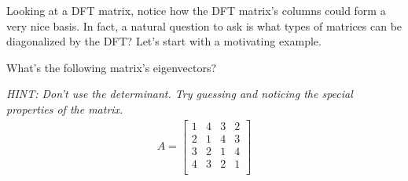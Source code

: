 

Looking at a DFT matrix, notice how the DFT matrix's columns could form a very nice basis.
In fact, a natural question to ask is what types of matrices can be diagonalized by the DFT?
Let's start with a motivating example.

\begin{enumerate}

\qitem
What's the following matrix's eigenvectors?

{\em HINT: Don't use the determinant. Try guessing and noticing the special properties of the matrix.}
\begin{align*}
  A =
\begin{bmatrix}
1 & 4 & 3 & 2 \\
2 & 1 & 4 & 3 \\
3 & 2 & 1 & 4 \\
4 & 3 & 2 & 1 \\
\end{bmatrix}
\end{align*}


\end{enumerate}
